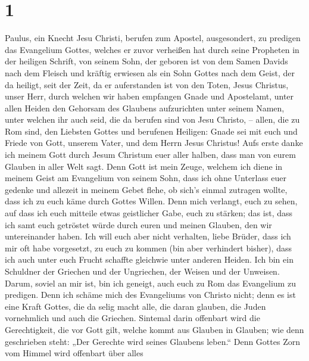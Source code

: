 \hypertarget{section}{%
\section{1}\label{section}}

 Paulus, ein Knecht Jesu Christi, berufen zum Apostel,
ausgesondert, zu predigen das Evangelium Gottes,  welches er
zuvor verheißen hat durch seine Propheten in der heiligen Schrift,
 von seinem Sohn, der geboren ist von dem Samen Davids nach
dem Fleisch  und kräftig erwiesen als ein Sohn Gottes nach
dem Geist, der da heiligt, seit der Zeit, da er auferstanden ist von den
Toten, Jesus Christus, unser Herr,  durch welchen wir haben
empfangen Gnade und Apostelamt, unter allen Heiden den Gehorsam des
Glaubens aufzurichten unter seinem Namen,  unter welchen ihr
auch seid, die da berufen sind von Jesu Christo, --  allen,
die zu Rom sind, den Liebsten Gottes und berufenen Heiligen: Gnade sei
mit euch und Friede von Gott, unserem Vater, und dem Herrn Jesus
Christus!  Aufs erste danke ich meinem Gott durch Jesum
Christum euer aller halben, dass man von eurem Glauben in aller Welt
sagt.  Denn Gott ist mein Zeuge, welchem ich diene in meinem
Geist am Evangelium von seinem Sohn, dass ich ohne Unterlass euer
gedenke  und allezeit in meinem Gebet flehe, ob sich's
einmal zutragen wollte, dass ich zu euch käme durch Gottes Willen.
 Denn mich verlangt, euch zu sehen, auf dass ich euch
mitteile etwas geistlicher Gabe, euch zu stärken;  das ist,
dass ich samt euch getröstet würde durch euren und meinen Glauben, den
wir untereinander haben.  Ich will euch aber nicht
verhalten, liebe Brüder, dass ich mir oft habe vorgesetzt, zu euch zu
kommen (bin aber verhindert bisher), dass ich auch unter euch Frucht
schaffte gleichwie unter anderen Heiden.  Ich bin ein
Schuldner der Griechen und der Ungriechen, der Weisen und der Unweisen.
 Darum, soviel an mir ist, bin ich geneigt, auch euch zu
Rom das Evangelium zu predigen.  Denn ich schäme mich des
Evangeliums von Christo nicht; denn es ist eine Kraft Gottes, die da
selig macht alle, die daran glauben, die Juden vornehmlich und auch die
Griechen.  Sintemal darin offenbart wird die Gerechtigkeit,
die vor Gott gilt, welche kommt aus Glauben in Glauben; wie denn
geschrieben steht: „Der Gerechte wird seines Glaubens leben.``
 Denn Gottes Zorn vom Himmel wird offenbart über alles
